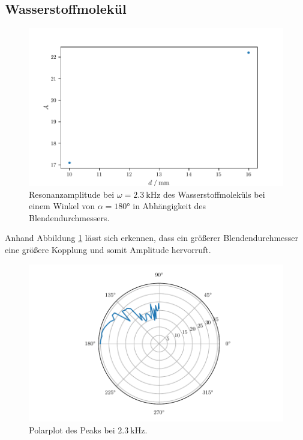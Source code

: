 \subsection{Wasserstoffmolekül}
\begin{figure}
    \centering
    \includegraphics{build/h2dia.pdf}
    \caption{Resonanzamplitude bei $\omega = \qty{2.3}{\kilo\hertz}$ des Wasserstoffmoleküls bei einem Winkel von $\alpha = \ang{180}$ in Abhängigkeit des Blendendurchmessers.}
    \label{fig:h2dia}
\end{figure}
Anhand Abbildung \ref{fig:h2dia} lässt sich erkennen, dass ein größerer Blendendurchmesser eine größere Kopplung und somit Amplitude hervorruft.
\begin{figure}
    \centering
    \includegraphics{build/h2varangle.pdf}
    \caption{Polarplot des Peaks bei $\qty{2.3}{\kilo\hertz}$.}
    \label{fig:h2varangle}
\end{figure}
